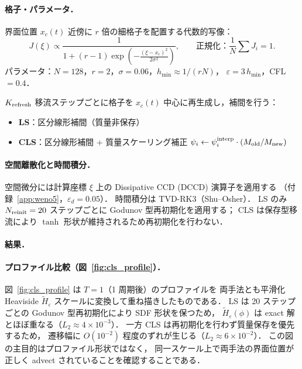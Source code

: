 \paragraph{格子・パラメータ．}

界面位置 $x_c(t)$ 近傍に $r$ 倍の細格子を配置する代数的写像：
\begin{equation}
  J(\xi) \propto \frac{1}{1 + (r-1)\exp\!\left(-\frac{(\xi - x_c)^2}{2\sigma^2}\right)},
  \qquad
  \text{正規化：}\frac{1}{N}\sum J_i = 1.
\end{equation}
パラメータ：$N=128$，$r=2$，$\sigma=0.06$，$h_{\min} \approx 1/(rN)$，
$\varepsilon = 3\,h_{\min}$，CFL $= 0.4$．

$K_{\rm refresh}$ 移流ステップごとに格子を $x_c(t)$ 中心に再生成し，補間を行う：
\begin{itemize}
  \item \textbf{LS}：区分線形補間（質量非保存）
  \item \textbf{CLS}：区分線形補間 $+$ 質量スケーリング補正
    $\psi_i \leftarrow \psi_i^{\rm interp} \cdot (M_{\rm old}/M_{\rm new})$
\end{itemize}

\paragraph{空間離散化と時間積分．}

空間微分には計算座標 $\xi$ 上の Dissipative CCD (DCCD) 演算子を適用する
（付録~\ref{app:weno5}，$\varepsilon_d = 0.05$）．
時間積分は TVD-RK3（Shu--Osher）．
LS のみ $N_{\rm reinit} = 20$ ステップごとに Godunov 型再初期化を適用する；
CLS は保存型移流により $\tanh$ 形状が維持されるため再初期化を行わない．

\paragraph{結果．}

\paragraph{プロファイル比較（図~\ref{fig:cls_profile}）．}
図~\ref{fig:cls_profile} は $T=1$（1 周期後）のプロファイルを
両手法とも平滑化 Heaviside $\tilde{H}_\varepsilon$ スケールに変換して重ね描きしたものである．
LS は 20 ステップごとの Godunov 型再初期化により SDF 形状を保つため，
$\tilde{H}_\varepsilon(\phi)$ は exact 解とほぼ重なる（$L_2 \approx 4\times10^{-3}$）．
一方 CLS は再初期化を行わず質量保存を優先するため，
遷移幅に $O(10^{-2})$ 程度のずれが生じる（$L_2 \approx 6\times10^{-2}$）．
この図の主目的はプロファイル形状ではなく，
同一スケール上で両手法の界面位置が正しく advect されていることを確認することである．

